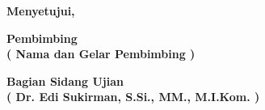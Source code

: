\begin{singlespace}
	\vspace{1.5cm}
	
	\begin{center}
		\textbf{Menyetujui,}
	\end{center}
	
	\vspace{0.3cm}
	
	\noindent
	\begin{minipage}[t]{0.5\textwidth}
		\centering
		\textbf{Pembimbing} \\
		\vspace{2.5cm} %
		\textbf{( Nama dan Gelar Pembimbing )}
	\end{minipage}%
	\begin{minipage}[t]{0.5\textwidth}
		\centering
		\textbf{Bagian Sidang Ujian} \\
		\vspace{2.5cm} %
		\textbf{( Dr. Edi Sukirman, S.Si., MM., M.I.Kom. )}
	\end{minipage}
	
\end{singlespace}